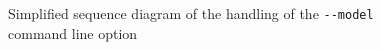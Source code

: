 \documentclass[a4paper]{article}
\begin{document}
\begin{figure}[ht]
  \centering
  \caption{Simplified sequence diagram of the handling of the \lstinline{--model} command line option}
  \label{fig:sd_client_model}
\end{figure}
\end{document}
